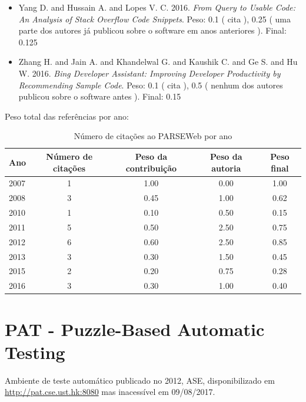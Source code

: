 \begin{itemize}
\item Yang D. and Hussain A. and Lopes V. C.
      2016.
        \textit{ From Query to Usable Code: An Analysis of Stack Overflow Code Snippets}.
      Peso:
      0.1 (
          cita
      ),
      0.25 (
uma parte dos autores já publicou sobre o software em anos anteriores
      ).
      Final:
      0.125

\item Zhang H. and Jain A. and Khandelwal G. and Kaushik C. and Ge S. and Hu W.
      2016.
        \textit{ Bing Developer Assistant: Improving Developer Productivity by Recommending Sample Code}.
      Peso:
      0.1 (
          cita
      ),
      0.5 (
nenhum dos autores publicou sobre o software antes
      ).
      Final:
      0.15

\end{itemize}

Peso total das referências por ano:

\begin{table}[h]
\caption{Número de citações ao PARSEWeb por ano}
\centering
\begin{tabular}{| l | c | c | c | c |}
  \hline
  Ano & Número de citações & Peso da contribuição & Peso da autoria & Peso final \\
  \hline
  2007
    & 1
    & 1.00
    & 0.00
    & 1.00 \\
  2008
    & 3
    & 0.45
    & 1.00
    & 0.62 \\
  2010
    & 1
    & 0.10
    & 0.50
    & 0.15 \\
  2011
    & 5
    & 0.50
    & 2.50
    & 0.75 \\
  2012
    & 6
    & 0.60
    & 2.50
    & 0.85 \\
  2013
    & 3
    & 0.30
    & 1.50
    & 0.45 \\
  2015
    & 2
    & 0.20
    & 0.75
    & 0.28 \\
  2016
    & 3
    & 0.30
    & 1.00
    & 0.40 \\
  \hline
\end{tabular}
\end{table}


\section{PAT - Puzzle-Based Automatic Testing}

Ambiente de teste automático
publicado no 2012, ASE,
disponibilizado em \url{http://pat.cse.ust.hk:8080}
mas inacessível em 09/08/2017.

